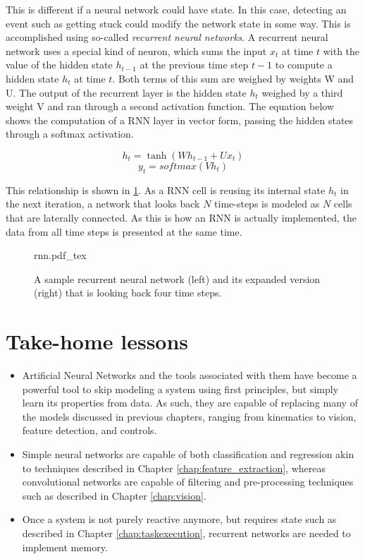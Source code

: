 This is different if a neural network could have state. In this case, detecting an event such as getting stuck could modify the network state in some way. This is accomplished using so-called \textsl{recurrent neural networks}. A recurrent neural network uses a special kind of neuron, which sums the input $x_t$ at time $t$ with the value of the hidden state $h_{t-1}$ at the previous time step $t-1$ to compute a hidden state $h_t$ at time $t$. Both terms of this sum are weighed by weights W and U. The output of the recurrent layer is the hidden state $h_t$ weighed by a third weight V and ran through a second activation function. The equation below shows the computation of a RNN layer in vector form, passing the hidden states through a softmax activation.

\begin{equation}
h_t = \tanh(Wh_{t-1}+Ux_t)
\end{equation}
\begin{equation}
y_t = softmax(Vh_t)
\end{equation}

This relationship is shown in \cref{fig:rnn}. As a RNN cell is reusing its internal state $h_t$ in the next iteration, a network that looks back $N$ time-steps is modeled as $N$ cells that are laterally connected. As this is how an RNN is actually implemented, the data from all time steps is presented at the same time.

\begin{figure}[htb]
\tiny
    \centering
    \def\svgwidth{\textwidth}
    {rnn.pdf_tex}
    \caption{A sample recurrent neural network (left) and its expanded version (right) that is looking back four time steps. \label{fig:rnn}}
\end{figure}

\section*{Take-home lessons}
\begin{itemize}
\item Artificial Neural Networks and the tools associated with them have become a powerful tool to skip modeling a system using first principles, but simply learn its properties from data. As such, they are capable of replacing many of the models discussed in previous chapters, ranging from kinematics to vision, feature detection, and controls.
\item Simple neural networks are capable of both classification and regression akin to techniques described in Chapter \ref{chap:feature_extraction}, whereas convolutional networks are capable of filtering and pre-processing techniques such as described in Chapter \ref{chap:vision}.
\item Once a system is not purely reactive anymore, but requires state such as described in Chapter \ref{chap:taskexecution}, recurrent networks are needed to implement memory. 
\end{itemize}
